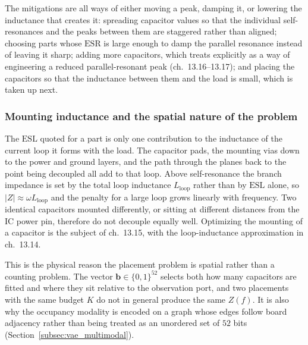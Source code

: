 The mitigations are all ways of either moving a peak, damping it, or lowering the
inductance that creates it: spreading capacitor values so that the individual
self-resonances and the peaks between them are staggered rather than aligned;
choosing parts whose $\mathrm{ESR}$ is large enough to damp the parallel
resonance instead of leaving it sharp; adding more capacitors, which
\cite{bogatin2018signal} treats explicitly as a way of engineering a reduced
parallel-resonant peak (ch.~13.16--13.17); and placing the capacitors so that the
inductance between them and the load is small, which is taken up next.

\subsubsection*{Mounting inductance and the spatial nature of the problem}

The $\mathrm{ESL}$ quoted for a part is only one contribution to the inductance
of the current loop it forms with the load. The capacitor pads, the mounting
vias down to the power and ground layers, and the path through the planes back to
the point being decoupled all add to that loop. Above self-resonance the branch
impedance is set by the total loop inductance $L_{\mathrm{loop}}$ rather than by
$\mathrm{ESL}$ alone, so $\lvert Z \rvert \approx \omega L_{\mathrm{loop}}$ and
the penalty for a large loop grows linearly with frequency. Two identical
capacitors mounted differently, or sitting at different distances from the IC
power pin, therefore do not decouple equally well. Optimizing the mounting of a
capacitor is the subject of \cite{bogatin2018signal} ch.~13.15, with the
loop-inductance approximation in ch.~13.14.

This is the physical reason the placement problem is spatial rather than a
counting problem. The vector $\mathbf{b} \in \{0,1\}^{52}$ selects both how many
capacitors are fitted and where they sit relative to the observation port, and
two placements with the same budget $K$ do not in general produce the same
$Z(f)$. It is also why the occupancy modality is encoded on a graph whose edges
follow board adjacency rather than being treated as an unordered set of $52$
bits (Section~\ref{subsec:vae_multimodal}).

